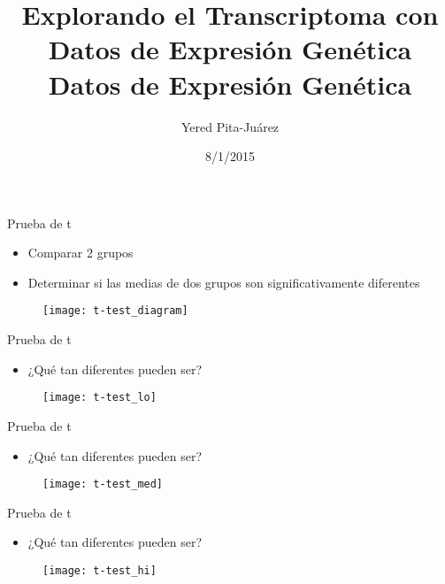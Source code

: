 \documentclass{beamer}
\begin{document}
\title[Contraste de Hipótesis]{Explorando el Transcriptoma con Datos de Expresi\'{o}n Gen\'{e}tica\\
\vspace{0.5cm}
Datos de Expresi\'{o}n Gen\'{e}tica}
\author{Yered Pita-Ju\'{a}rez}
\date{8/1/2015}


\begin{frame}
\titlepage
\end{frame}

\begin{frame}{Prueba de t}
\begin{itemize}
\item Comparar 2 grupos 
\item Determinar si las medias de dos grupos son significativamente diferentes
\end{itemize}
\begin{figure}
\centering
\texttt{[image: t-test\_diagram]}
\end{figure}
\end{frame}

\begin{frame}{Prueba de t}
\begin{itemize}
\item ¿Qué tan diferentes pueden ser?
\end{itemize}
\begin{figure}
\centering
\texttt{[image: t-test\_lo]}
\end{figure}
\end{frame}

\begin{frame}{Prueba de t}
\begin{itemize}
\item ¿Qué tan diferentes pueden ser?
\end{itemize}
\begin{figure}
\centering
\texttt{[image: t-test\_med]}
\end{figure}
\end{frame}

\begin{frame}{Prueba de t}
\begin{itemize}
\item ¿Qué tan diferentes pueden ser?
\end{itemize}
\begin{figure}
\centering
\texttt{[image: t-test\_hi]}
\end{figure}
\end{frame}
\end{document}
